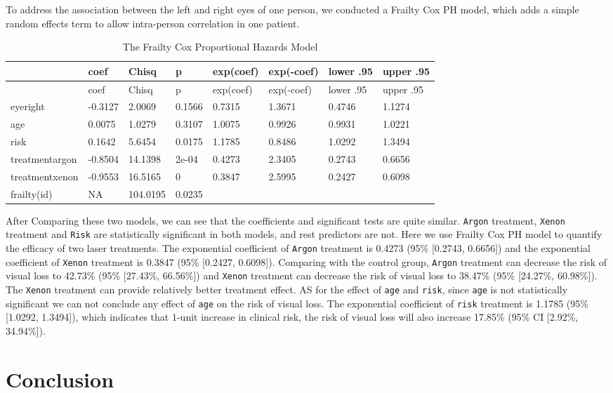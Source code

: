 \documentclass[
]{article}
\begin{document}
To address the association between the left and right eyes of one
person, we conducted a Frailty Cox PH model, which adds a simple random
effects term to allow intra-person correlation in one patient.

\begin{longtable}[]{@{}llllllll@{}}
\caption{The Frailty Cox Proportional Hazards Model}\tabularnewline
\toprule
& coef & Chisq & p & exp(coef) & exp(-coef) & lower .95 & upper
.95\tabularnewline
\midrule
\endfirsthead
\toprule
& coef & Chisq & p & exp(coef) & exp(-coef) & lower .95 & upper
.95\tabularnewline
\midrule
\endhead
eyeright & -0.3127 & 2.0069 & 0.1566 & 0.7315 & 1.3671 & 0.4746 &
1.1274\tabularnewline
age & 0.0075 & 1.0279 & 0.3107 & 1.0075 & 0.9926 & 0.9931 &
1.0221\tabularnewline
risk & 0.1642 & 5.6454 & 0.0175 & 1.1785 & 0.8486 & 1.0292 &
1.3494\tabularnewline
treatmentargon & -0.8504 & 14.1398 & 2e-04 & 0.4273 & 2.3405 & 0.2743 &
0.6656\tabularnewline
treatmentxenon & -0.9553 & 16.5165 & 0 & 0.3847 & 2.5995 & 0.2427 &
0.6098\tabularnewline
frailty(id) & NA & 104.0195 & 0.0235 & & & &\tabularnewline
\bottomrule
\end{longtable}

After Comparing these two models, we can see that the coefficients and
significant tests are quite similar. \texttt{Argon} treatment,
\texttt{Xenon} treatment and \texttt{Risk} are statistically significant
in both models, and rest predictors are not. Here we use Frailty Cox PH
model to quantify the efficacy of two laser treatments. The exponential
coefficient of \texttt{Argon} treatment is 0.4273 (95\% {[}0.2743,
0.6656{]}) and the exponential coefficient of \texttt{Xenon} treatment
is 0.3847 (95\% {[}0.2427, 0.6098{]}). Comparing with the control group,
\texttt{Argon} treatment can decrease the risk of visual loss to 42.73\%
(95\% {[}27.43\%, 66.56\%{]}) and \texttt{Xenon} treatment can decrease
the risk of visual loss to 38.47\% (95\% {[}24.27\%, 60.98\%{]}). The
\texttt{Xenon} treatment can provide relatively better treatment effect.
AS for the effect of \texttt{age} and \texttt{risk}, since \texttt{age}
is not statistically significant we can not conclude any effect of
\texttt{age} on the risk of visual loss. The exponential coefficient of
\texttt{risk} treatment is 1.1785 (95\% {[}1.0292, 1.3494{]}), which
indicates that 1-unit increase in clinical risk, the risk of visual loss
will also increase 17.85\% (95\% CI {[}2.92\%, 34.94\%{]}).

\hypertarget{conclusion}{%
\section{Conclusion}\label{conclusion}}
\end{document}
